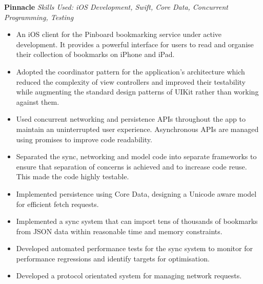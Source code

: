 \textbf{Pinnacle}  \newline
\textit{Skills Used: iOS Development, Swift, Core Data, Concurrent Programming, Testing}
%
\begin{itemize}[leftmargin=0mm]
\item An iOS client for the Pinboard bookmarking service under active
  development. It provides a powerful interface for users to read and organise
  their collection of bookmarks on iPhone and iPad.
\item Adopted the coordinator pattern for the application's architecture which
  reduced the complexity of view controllers and improved their testability
  while augmenting the standard design patterns of UIKit rather than working
  against them.
\item Used concurrent networking and persistence APIs throughout the app to
  maintain an uninterrupted user experience. Asynchronous APIs are managed using
  promises to improve code readability.
\item Separated the sync, networking and model code into separate frameworks to
  ensure that separation of concerns is achieved and to increase code
  reuse. This made the code highly testable.
\item Implemented persistence using Core Data, designing a Unicode aware model
  for efficient fetch requests.
\item Implemented a sync system that can import tens of thousands of bookmarks
  from JSON data within reasonable time and memory constraints.
\item Developed automated performance tests for the sync system to monitor for
  performance regressions and identify targets for optimisation.
\item Developed a protocol orientated system for managing network requests.
\end{itemize}

